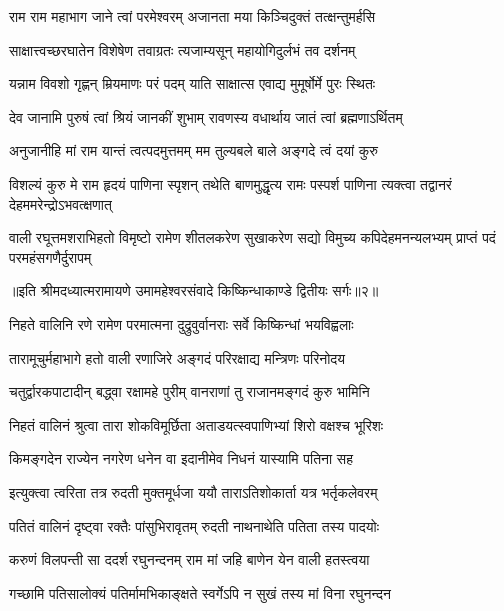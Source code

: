 \twolineshloka
{राम राम महाभाग जाने त्वां परमेश्वरम्}
{अजानता मया किञ्चिदुक्तं तत्क्षन्तुमर्हसि} %

\twolineshloka
{साक्षात्त्वच्छरघातेन विशेषेण तवाग्रतः}
{त्यजाम्यसून् महायोगिदुर्लभं तव दर्शनम्} %

\twolineshloka
{यन्नाम विवशो गृह्णन् म्रियमाणः परं पदम्}
{याति साक्षात्स एवाद्य मुमूर्षोर्मे पुरः स्थितः} %

\twolineshloka
{देव जानामि पुरुषं त्वां श्रियं जानकीं शुभाम्}
{रावणस्य वधार्थाय जातं त्वां ब्रह्मणाऽर्थितम्} %

\twolineshloka
{अनुजानीहि मां राम यान्तं त्वत्पदमुत्तमम्}
{मम तुल्यबले बाले अङ्गदे त्वं दयां कुरु} %

\threelineshloka
{विशल्यं कुरु मे राम हृदयं पाणिना स्पृशन्}
{तथेति बाणमुद्धृत्य रामः पस्पर्श पाणिना}
{त्यक्त्वा तद्वानरं देहममरेन्द्रोऽभवत्क्षणात्} %

\fourlineindentedshloka
{वाली रघूत्तमशराभिहतो विमृष्टो}
{रामेण शीतलकरेण सुखाकरेण}
{सद्यो विमुच्य कपिदेहमनन्यलभ्यम्}
{प्राप्तं पदं परमहंसगणैर्दुरापम्} %

{॥इति श्रीमदध्यात्मरामायणे उमामहेश्वरसंवादे किष्किन्धाकाण्डे
द्वितीयः सर्गः॥२॥
}




\twolineshloka
{निहते वालिनि रणे रामेण परमात्मना}
{दुद्रुवुर्वानराः सर्वे किष्किन्धां भयविह्वलाः} %

\twolineshloka
{तारामूचुर्महाभागे हतो वाली रणाजिरे}
{अङ्गदं परिरक्षाद्य मन्त्रिणः परिनोदय} %

\twolineshloka
{चतुर्द्वारकपाटादीन् बद्ध्वा रक्षामहे पुरीम्}
{वानराणां तु राजानमङ्गदं कुरु भामिनि} %

\twolineshloka
{निहतं वालिनं श्रुत्वा तारा शोकविमूर्छिता}
{अताडयत्स्वपाणिभ्यां शिरो वक्षश्च भूरिशः} %

\twolineshloka
{किमङ्गदेन राज्येन नगरेण धनेन वा}
{इदानीमेव निधनं यास्यामि पतिना सह} %

\twolineshloka
{इत्युक्त्वा त्वरिता तत्र रुदती मुक्तमूर्धजा}
{ययौ ताराऽतिशोकार्ता यत्र भर्तृकलेवरम्} %

\twolineshloka
{पतितं वालिनं दृष्ट्वा रक्तैः पांसुभिरावृतम्}
{रुदती नाथनाथेति पतिता तस्य पादयोः} %

\twolineshloka
{करुणं विलपन्ती सा ददर्श रघुनन्दनम्}
{राम मां जहि बाणेन येन वाली हतस्त्वया} %

\twolineshloka
{गच्छामि पतिसालोक्यं पतिर्मामभिकाङ्क्षते}
{स्वर्गेऽपि न सुखं तस्य मां विना रघुनन्दन} %

